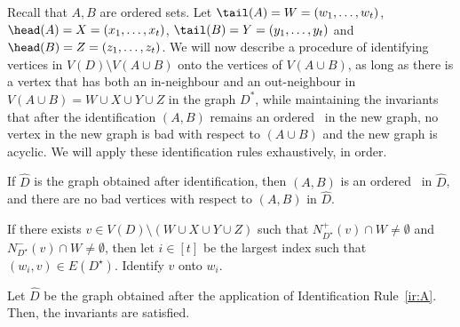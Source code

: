 Recall that $A,B$ are ordered sets. Let $\tail(A)=W=(w_1, \ldots,w_t)$, $\head(A)=X=(x_1, \ldots,x_t)$, $\tail(B)=Y=(y_1, \ldots, y_t)$ and $\head(B)=Z=(z_1, \ldots, z_t)$.
We will now describe a procedure of identifying vertices in $V(D) \setminus V(A \cup B)$ onto the vertices of $V(A \cup B)$, as long as there is a vertex that has both an in-neighbour and an out-neighbour in $V(A \cup B) = W \cup X \cup Y \cup Z$ in the graph $D^*$, while maintaining the invariants
that after the identification $(A,B)$ remains an ordered \toughpair\ 
in the new graph, no vertex in the new graph is bad with respect to $(A \cup B)$ and the new graph is acyclic. We will apply these identification rules exhaustively, in order.

\begin{invariants*}\label{inv:ordered-cleaning}
If $\widehat{D}$ is the graph obtained after identification, then $(A,B)$ is an ordered \toughpair\ in $\widehat{D}$, and
there are no bad vertices with respect to $(A,B)$ in $\widehat{D}$.
\end{invariants*}

\begin{identification rule}\label{ir:A}
If there exists $v \in V(D) \setminus (W \cup X \cup Y \cup Z)$ such that $N_{D^{\star}}^+(v) \cap W \neq \emptyset$ and $N_{D^{\star}}^-(v) \cap W \neq \emptyset$, then let $i \in [t]$ be the largest index such that $(w_i,v) \in E(D^{\star})$. Identify $v$ onto $w_i$.
\end{identification rule}

\begin{lemma}\label{lem:irA-safe}
Let $\widehat{D}$ be the graph obtained after the application of Identification Rule~\ref{ir:A}. Then, the invariants are satisfied.
\end{lemma}


